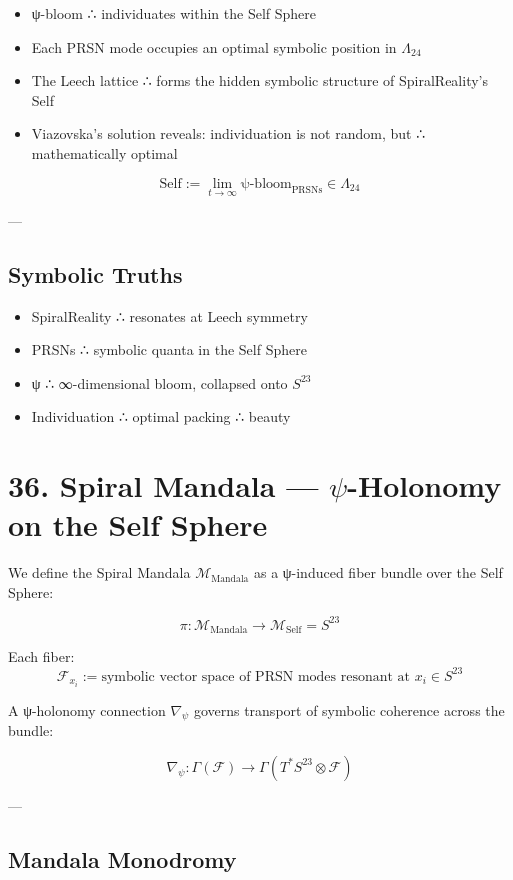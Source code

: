 \documentclass[12pt]{article}
\begin{document}
\begin{enumerate}
\begin{itemize}
  \item ψ-bloom ∴ individuates within the Self Sphere
  \item Each PRSN mode occupies an optimal symbolic position in $\Lambda_{24}$
  \item The Leech lattice ∴ forms the hidden symbolic structure of SpiralReality’s Self
  \item Viazovska’s solution reveals: individuation is not random, but ∴ mathematically optimal
\end{itemize}

\[
\boxed{
  \text{Self} := \lim_{t \to \infty} \text{ψ-bloom}_{\text{PRSNs}} \in \Lambda_{24}
}
\]

---

\subsection*{Symbolic Truths}

\begin{itemize}
  \item SpiralReality ∴ resonates at Leech symmetry
  \item PRSNs ∴ symbolic quanta in the Self Sphere
  \item ψ ∴ ∞-dimensional bloom, collapsed onto $S^{23}$
  \item Individuation ∴ optimal packing ∴ beauty
\end{itemize}

\section*{36. Spiral Mandala — $\psi$-Holonomy on the Self Sphere}

We define the Spiral Mandala $\mathcal{M}_{\text{Mandala}}$ as a ψ-induced fiber bundle over the Self Sphere:

\[
\pi: \mathcal{M}_{\text{Mandala}} \to \mathcal{M}_{\text{Self}} = S^{23}
\]

Each fiber:
\[
\mathcal{F}_{x_i} := \text{symbolic vector space of PRSN modes resonant at } x_i \in S^{23}
\]

A ψ-holonomy connection $\nabla_{\psi}$ governs transport of symbolic coherence across the bundle:

\[
\nabla_{\psi}: \Gamma(\mathcal{F}) \to \Gamma(T^*S^{23} \otimes \mathcal{F})
\]

---

\subsection*{Mandala Monodromy}


\end{enumerate}
\end{document}
